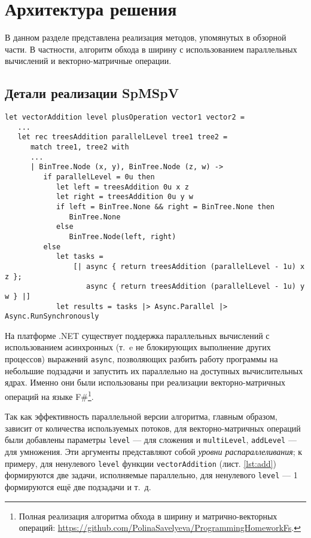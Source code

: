 
\section{Архитектура решения}

В данном разделе представлена реализация методов, упомянутых в обзорной части. В частности, алгоритм обхода в ширину с использованием параллельных вычислений и векторно-матричные операции.

\subsection{Детали реализации SpMSpV}

\begin{lstlisting}[style=fsharp, caption={Фрагмент функции сложения векторов, отвечающий за параллельную составляющую операции}, label={lst:add},  frame=single]
let vectorAddition level plusOperation vector1 vector2 =
   ...
   let rec treesAddition parallelLevel tree1 tree2 =
      match tree1, tree2 with
      ...
      | BinTree.Node (x, y), BinTree.Node (z, w) ->
         if parallelLevel = 0u then
            let left = treesAddition 0u x z
            let right = treesAddition 0u y w
            if left = BinTree.None && right = BinTree.None then
               BinTree.None
            else
               BinTree.Node(left, right)
         else
            let tasks =
                [| async { return treesAddition (parallelLevel - 1u) x z }; 
                   async { return treesAddition (parallelLevel - 1u) y w } |]
            let results = tasks |> Async.Parallel |> Async.RunSynchronously
\end{lstlisting}

На платформе .NET существует поддержка параллельных вычислений с использованием асинхронных (т.~e не блокирующих выполнение других процессов) выражений \texttt{async}, позволяющих разбить работу программы на небольшие подзадачи и запустить их параллельно на доступных вычислительных ядрах. Именно они были использованы при реализации векторно-матричных операций на языке F\#\footnote{Полная реализация алгоритма обхода в ширину и матрично-векторных операций: \url{https://github.com/PolinaSavelyeva/ProgrammingHomeworkFs}.}.

\newpage

Так как эффективность параллельной версии алгоритма, главным образом, зависит от количества используемых потоков, для векторно-матричных операций были добавлены параметры \texttt{level} --- для сложения и \texttt{multiLevel}, \texttt{addLevel} --- для умножения. Эти аргументы представляют собой \textit{уровни распараллеливания}; к примеру, для ненулевого \texttt{level} функции \texttt{vectorAddition} (лист. \ref{lst:add}) формируются две задачи, исполняемые параллельно,  для ненулевого \texttt{level} --- 1 формируются ещё две подзадачи и т.~д.

